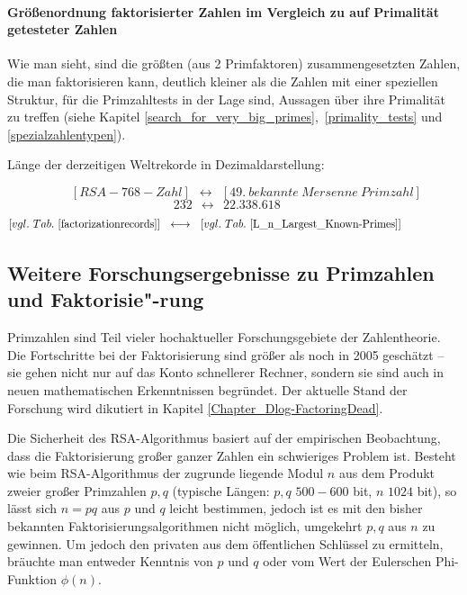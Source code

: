 \begin{refsegment}
\paragraph*{Größenordnung faktorisierter Zahlen im Vergleich zu auf Primalität
getesteter Zahlen}
\mbox{}

Wie man sieht, sind die größten (aus 2 Primfaktoren) zusammengesetzten
Zahlen, die man faktorisieren kann, deutlich kleiner als die Zahlen mit
einer speziellen Struktur, für die Primzahltests in
der Lage sind, Aussagen über ihre Primalität zu treffen (siehe Kapitel
\ref{search_for_very_big_primes},~\ref{primality_tests} und
\ref{spezialzahlentypen}).


Länge der derzeitigen Weltrekorde in Dezimaldarstellung:

$$  ~~~~~~~~~[RSA{-}768{-}Zahl] ~~\longleftrightarrow{}~~[49.~bekannte~Mersenne~Primzahl] $$
$$ 232 ~~ \longleftrightarrow{} ~~ 22.338.618 ~~~~~$$
$$ [vgl.~Tab.~\ref{factorizationrecords}] ~~\longleftrightarrow{}~~ [vgl.~Tab.~\ref{L_n_Largest_Known-Primes}] ~~~~~~~~~~~~~~~~$$




\subsection[Weitere Forschungsergebnisse zu Primzahlen und Faktorisierung]
           {Weitere Forschungsergebnisse zu Primzahlen und Faktorisie"-rung}
\label{FactorisationResearch}
Primzahlen sind Teil vieler hochaktueller Forschungsgebiete der Zahlentheorie.
Die Fortschritte bei der Faktorisierung sind größer als noch in 2005
geschätzt -- sie gehen nicht nur auf das Konto schnellerer Rechner,
sondern sie sind auch in neuen mathematischen Erkenntnissen begründet.
Der aktuelle Stand der Forschung wird dikutiert in Kapitel \ref{Chapter_Dlog-FactoringDead}.

Die Sicherheit des RSA-Algorithmus basiert auf der empirischen Beobachtung,
dass die Faktorisierung großer ganzer Zahlen ein schwieriges Problem ist.
Besteht wie beim RSA-Algorithmus der zugrunde liegende Modul $n$ aus dem Produkt
zweier großer Primzahlen $p, q$ (typische Längen: $p, q$  $500-600$ bit,
$n$ $1024$ bit), so lässt sich $n=pq$ aus $p$ und $q$ leicht bestimmen,
jedoch ist es mit den bisher bekannten Faktorisierungsalgorithmen nicht
möglich, umgekehrt $p, q$ aus $n$ zu gewinnen.
Um jedoch den privaten aus dem öffentlichen Schlüssel zu ermitteln,
bräuchte man entweder Kenntnis von $p$ und $q$ oder vom Wert der
Eulerschen Phi-Funktion $\phi(n)$.


\end{refsegment}
